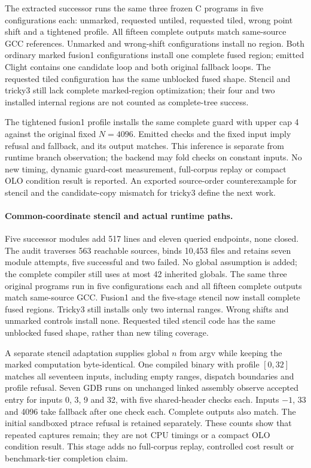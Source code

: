 The extracted successor runs the same three frozen C programs in five
configurations each: unmarked, requested untiled, requested tiled, wrong point
shift and a tightened profile. All fifteen complete outputs match same-source
GCC references. Unmarked and wrong-shift configurations install no region.
Both ordinary marked fusion1 configurations install one complete fused region;
emitted Clight contains one candidate loop and both original fallback loops.
The requested tiled configuration has the same unblocked fused shape. Stencil
and tricky3 still lack complete marked-region optimization; their four and two
installed internal regions are not counted as complete-tree success.

The tightened fusion1 profile installs the same complete guard with upper cap
4 against the original fixed $N=4096$. Emitted checks and the fixed input imply
refusal and fallback, and its output matches. This inference is separate from
runtime branch observation; the backend may fold checks on constant inputs.
No new timing, dynamic guard-cost measurement, full-corpus replay or compact OLO
condition result is reported. An exported source-order counterexample for
stencil and the candidate-copy mismatch for tricky3 define the next work.

\paragraph{Common-coordinate stencil and actual runtime paths.}
Five successor modules add 517 lines and eleven queried endpoints, none closed.
The audit traverses 563 reachable sources, binds 10,453 files and retains seven
module attempts, five successful and two failed. No global assumption is added;
the complete compiler still uses at most 42 inherited globals. The same three
original programs run in five configurations each and all fifteen complete
outputs match same-source GCC. Fusion1 and the five-stage stencil now install
complete fused regions. Tricky3 still installs only two internal ranges.
Wrong shifts and unmarked controls install none. Requested tiled stencil code
has the same unblocked fused shape, rather than new tiling coverage.

A separate stencil adaptation supplies global $n$ from argv while keeping the
marked computation byte-identical. One compiled binary with profile $[0,32]$
matches all seventeen inputs, including empty ranges, dispatch boundaries and
profile refusal. Seven GDB runs on unchanged linked assembly observe accepted
entry for inputs 0, 3, 9 and 32, with five shared-header checks each.
Inputs $-1$, 33 and 4096 take fallback after one check each.
Complete outputs also match. The initial
sandboxed ptrace refusal is retained separately. These counts show that repeated
captures remain; they are not CPU timings or a compact OLO condition result.
This stage adds no full-corpus replay, controlled cost result or benchmark-tier
completion claim.


